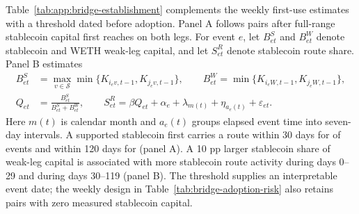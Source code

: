 Table~\ref{tab:app:bridge-establishment} complements the weekly first-use estimates with a threshold dated before adoption. Panel A follows pairs after full-range stablecoin capital first reaches \BridgeExanteThreshold{} on both legs. For event \(e\), let \(B^S_{et}\) and \(B^W_{et}\) denote stablecoin and WETH weak-leg capital, and let \(S^R_{et}\) denote stablecoin route share. Panel B estimates
\begin{equation}
\begin{aligned}
B^S_{et}&=\max_{v\in\mathcal S}\min\{K_{i_ev,t-1},K_{j_ev,t-1}\},\qquad
B^W_{et}=\min\{K_{i_eW,t-1},K_{j_eW,t-1}\},\\
Q_{et}&=\frac{B^S_{et}}{B^S_{et}+B^W_{et}},\qquad
S^R_{et}=\beta Q_{et}+\alpha_e+\lambda_{m(t)}+\eta_{a_e(t)}+\varepsilon_{et}.
\end{aligned}
\label{eq:app:bridge-relative-depth}
\end{equation}
Here \(m(t)\) is calendar month and \(a_e(t)\) groups elapsed event time into seven-day intervals. A supported stablecoin first carries a route within 30 days for \BridgeExanteAdoptionThirty{} of events and within 120 days for \BridgeExanteAdoptionOneTwenty{} (panel A). A 10 pp larger stablecoin share of weak-leg capital is associated with \BridgeExanteDepthThirty{} more stablecoin route activity during days 0--29 and \BridgeExanteDepthOneTwenty{} during days 30--119 (panel B). The threshold supplies an interpretable event date; the weekly design in Table~\ref{tab:bridge-adoption-risk} also retains pairs with zero measured stablecoin capital.

\begin{table}[tbp]
\caption{Capital thresholds, stablecoin adoption, and route allocation}
\label{tab:app:bridge-establishment}
\centering
\small
\renewcommand{\arraystretch}{1.08}

\end{table}
\FloatBarrier

